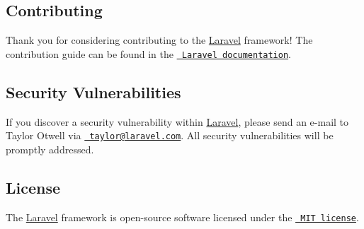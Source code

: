 \subsection*{Contributing}

Thank you for considering contributing to the \mbox{\hyperlink{namespaceLaravel}{Laravel}} framework! The contribution guide can be found in the \href{https://laravel.com/docs/contributions}{\texttt{ Laravel documentation}}.

\subsection*{Security Vulnerabilities}

If you discover a security vulnerability within \mbox{\hyperlink{namespaceLaravel}{Laravel}}, please send an e-\/mail to Taylor Otwell via \href{mailto:taylor@laravel.com}{\texttt{ taylor@laravel.\+com}}. All security vulnerabilities will be promptly addressed.

\subsection*{License}

The \mbox{\hyperlink{namespaceLaravel}{Laravel}} framework is open-\/source software licensed under the \href{https://opensource.org/licenses/MIT}{\texttt{ M\+IT license}}. 